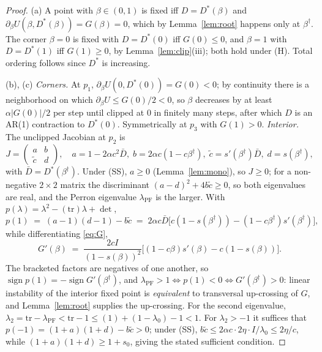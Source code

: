 \documentclass[11pt]{article}
\theoremstyle{definition}
\theoremstyle{remark}
\numberwithin{equation}{section}
\begin{document}
\begin{proof}
(a) A point with $\beta \in (0,1)$ is fixed iff $D = D^\ast(\beta)$ and $\partial_\beta U(\beta, D^\ast(\beta)) = G(\beta) = 0$, which by Lemma~\ref{lem:root} happens only at $\beta^\dagger$. The corner $\beta = 0$ is fixed with $D = D^\ast(0)$ iff $G(0) \le 0$, and $\beta = 1$ with $D = D^\ast(1)$ iff $G(1) \ge 0$, by Lemma~\ref{lem:clip}(iii); both hold under (H). Total ordering follows since $D^\ast$ is increasing.

(b), (c) \emph{Corners.} At $p_1$, $\partial_\beta U(0, D^\ast(0)) = G(0) < 0$; by continuity there is a neighborhood on which $\partial_\beta U \le G(0)/2 < 0$, so $\beta$ decreases by at least $\alpha|G(0)|/2$ per step until clipped at $0$ in finitely many steps, after which $D$ is an AR(1) contraction to $D^\ast(0)$. Symmetrically at $p_3$ with $G(1) > 0$. \emph{Interior.} The unclipped Jacobian at $p_2$ is
\[
J = \begin{pmatrix} a & b \\ \tilde c & d \end{pmatrix},
\quad a = 1 - 2\alpha c^2 \bar D,\; b = 2\alpha c(1-c\beta^\dagger),\; \tilde c = s'(\beta^\dagger)\bar D,\; d = s(\beta^\dagger),
\]
with $\bar D = D^\ast(\beta^\dagger)$. Under (SS), $a \ge 0$ (Lemma~\ref{lem:mono}), so $J \ge 0$; for a non-negative $2\times 2$ matrix the discriminant $(a-d)^2 + 4b\tilde c \ge 0$, so both eigenvalues are real, and the Perron eigenvalue $\lambda_{\mathrm{PF}}$ is the larger. With $p(\lambda) = \lambda^2 - (\mathrm{tr})\lambda + \det$,
\[
p(1) \;=\; (a-1)(d-1) - b\tilde c
\;=\; 2\alpha c \bar D\bigl[c(1-s(\beta^\dagger)) - (1-c\beta^\dagger)s'(\beta^\dagger)\bigr],
\]
while differentiating \eqref{eq:G},
\[
G'(\beta) \;=\; \frac{2cI}{(1-s(\beta))^2}\bigl[(1-c\beta)s'(\beta) - c(1-s(\beta))\bigr].
\]
The bracketed factors are negatives of one another, so $\operatorname{sign} p(1) = -\operatorname{sign} G'(\beta^\dagger)$, and $\lambda_{\mathrm{PF}} > 1 \iff p(1) < 0 \iff G'(\beta^\dagger) > 0$: linear instability of the interior fixed point is \emph{equivalent} to transversal up-crossing of $G$, and Lemma~\ref{lem:root} supplies the up-crossing. For the second eigenvalue, $\lambda_2 = \mathrm{tr} - \lambda_{\mathrm{PF}} < \mathrm{tr} - 1 \le (1) + (1-\lambda_0) - 1 < 1$. For $\lambda_2 > -1$ it suffices that $p(-1) = (1+a)(1+d) - b\tilde c > 0$; under (SS), $b\tilde c \le 2\alpha c \cdot 2\eta \cdot I/\lambda_0 \le 2\eta/c$, while $(1+a)(1+d) \ge 1 + s_0$, giving the stated sufficient condition.


\end{proof}
\end{document}
